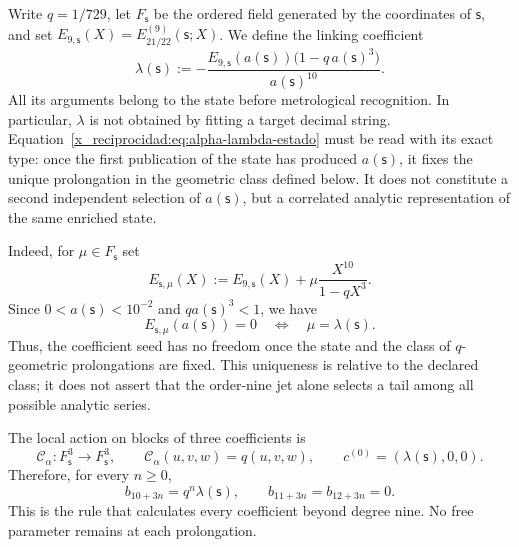 Write \(q=1/729\), let \(F_{\mathsf s}\) be the ordered field generated by
the coordinates of \(\mathsf s\), and set
\(E_{9,\mathsf s}(X)=E_{21/22}^{(9)}(\mathsf s;X)\). We define the linking
coefficient
\begin{equation}
 \lambda(\mathsf s):=
 -\frac{E_{9,\mathsf s}(a(\mathsf s))
         \bigl(1-q\,a(\mathsf s)^3\bigr)}{a(\mathsf s)^{10}}.
 \label{x_reciprocidad:eq:alpha-lambda-estado}
\end{equation}
All its arguments belong to the state before metrological
recognition. In particular, \(\lambda\) is not obtained by fitting a target decimal
string. Equation~\eqref{x_reciprocidad:eq:alpha-lambda-estado} must be read with
its exact type: once the first publication of the state has produced
\(a(\mathsf s)\), it fixes the unique prolongation in the geometric class defined
below. It does not constitute a second independent selection of
\(a(\mathsf s)\), but a correlated analytic representation of the same
enriched state.

Indeed, for \(\mu\in F_{\mathsf s}\) set
\[
 E_{\mathsf s,\mu}(X)
 :=E_{9,\mathsf s}(X)+\mu\frac{X^{10}}{1-qX^3}.
\]
Since \(0<a(\mathsf s)<10^{-2}\) and \(qa(\mathsf s)^3<1\), we have
\begin{equation}
 E_{\mathsf s,\mu}(a(\mathsf s))=0
 \quad\Longleftrightarrow\quad
 \mu=\lambda(\mathsf s).
 \label{x_reciprocidad:eq:alpha-unicidad-lambda-clase-geometrica}
\end{equation}
Thus, the coefficient seed has no freedom once the state
and the class of \(q\)-geometric prolongations are fixed. This uniqueness is relative to the
declared class; it does not assert that the order-nine jet alone selects a
tail among all possible analytic series.

The local action on blocks of three coefficients is
\begin{equation}
 \mathcal C_\alpha:F_{\mathsf s}^{3}\longrightarrow F_{\mathsf s}^{3},
 \qquad \mathcal C_\alpha(u,v,w)=q(u,v,w),
 \qquad c^{(0)}=(\lambda(\mathsf s),0,0).
 \label{x_reciprocidad:eq:alpha-accion-coeficientes}
\end{equation}
Therefore, for every \(n\geq0\),
\begin{equation}
 b_{10+3n}=q^n\lambda(\mathsf s),\qquad
 b_{11+3n}=b_{12+3n}=0.
 \label{x_reciprocidad:eq:alpha-recurrencia-coeficientes}
\end{equation}
This is the rule that calculates every coefficient beyond degree nine. No
free parameter remains at each prolongation.

